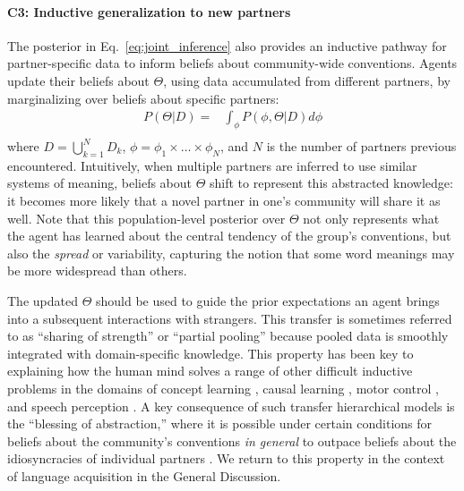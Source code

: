 \paragraph{C3: Inductive generalization to new partners}

The posterior in Eq.~\ref{eq:joint_inference} also provides an inductive pathway for partner-specific data to inform beliefs about community-wide conventions.
Agents update their beliefs about $\Theta$, using data accumulated from different partners, by marginalizing over beliefs about specific partners:
\begin{equation}
\begin{split}
    P(\Theta | D)  = & \int_{\phi} P(\phi, \Theta | D) d\phi \\
\end{split}
\end{equation}
where $D = \bigcup_{k=1}^N D_k$, $\phi = \phi_1 \times \dots \times \phi_N$, and $N$ is the number of partners previous encountered. 
Intuitively, when multiple partners are inferred to use similar systems of meaning, beliefs about $\Theta$ shift to represent this abstracted knowledge: it becomes more likely that a novel partner in one's community will share it as well.
Note that this population-level posterior over $\Theta$ not only represents what the agent has learned about the central tendency of the group's conventions, but also the \emph{spread} or variability, capturing the notion that some word meanings may be more widespread than others.

The updated $\Theta$ should be used to guide the prior expectations an agent brings into a subsequent interactions with strangers.
This transfer is sometimes referred to as ``sharing of strength'' or ``partial pooling'' because pooled data is smoothly integrated with domain-specific knowledge.
This property has been key to explaining how the human mind solves a range of other difficult inductive problems in the domains of concept learning \cite{KempPerforsTenenbaum07_HBM, tenenbaum_how_2011}, causal learning \cite{KempPerforsTenenbaum07_HBM,KempGoodmanTenenbaum10_LearningToLearn},  motor control \cite{berniker2008estimating}, and speech perception \cite{kleinschmidt2015robust}.
A key consequence of such transfer hierarchical models is the ``blessing of abstraction,'' \cite{GoodmanUllmanTenenbaum11_TheoryOfCausality} where it is possible under certain conditions for beliefs about the community's conventions \emph{in general} to outpace beliefs about the idiosyncracies of individual partners \cite{gershman2017blessing}.
We return to this property in the context of language acquisition in the General Discussion.

